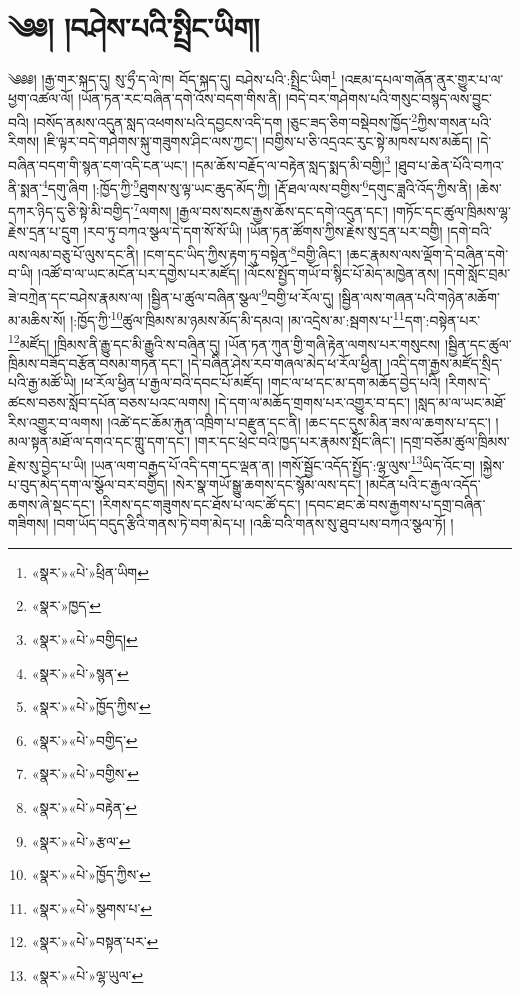 \chapter{༄༅། །བཤེས་པའི་སྤྲིང་ཡིག།}༄༅༅། །རྒྱ་གར་སྐད་དུ། སུ་ཧྲྀ་ད་ལེ་ཁ། བོད་སྐད་དུ། བཤེས་པའི་:སྤྲིང་ཡིག\footnote{«སྣར་»«པེ་»ཕྲིན་ཡིག} །འཇམ་དཔལ་གཞོན་ནུར་གྱུར་པ་ལ་ཕྱག་འཚལ་ལོ། །ཡོན་ཏན་རང་བཞིན་དགེ་འོས་བདག་གིས་ནི། །བདེ་བར་གཤེགས་པའི་གསུང་བསྙད་ལས་བྱུང་བའི། །བསོད་ནམས་འདུན་སླད་འཕགས་པའི་དབྱངས་འདི་དག །ཅུང་ཟད་ཅིག་བསྡེབས་ཁྱོད་\footnote{«སྣར་»ཁྱད་}ཀྱིས་གསན་པའི་རིགས། །ཇི་ལྟར་བདེ་གཤེགས་སྐུ་གཟུགས་ཤིང་ལས་ཀྱང་། །བགྱིས་པ་ཅི་འདྲའང་རུང་སྟེ་མཁས་པས་མཆོད། །དེ་བཞིན་བདག་གི་སྙན་ངག་འདི་ངན་ཡང་། །དམ་ཆོས་བརྗོད་ལ་བརྟེན་སླད་སྨད་མི་བགྱི།\footnote{«སྣར་»«པེ་»བགྱིད།} །ཐུབ་པ་ཆེན་པོའི་བཀའ་ནི་སྨན་\footnote{«སྣར་»«པེ་»སྙན་}དགུ་ཞིག །:ཁྱོད་ཀྱི་\footnote{«སྣར་»«པེ་»ཁྱོད་ཀྱིས་}ཐུགས་སུ་ལྟ་ཡང་ཆུད་མོད་ཀྱི། །རྡོ་ཐལ་ལས་བགྱིས་\footnote{«སྣར་»«པེ་»བགྱིད་}དགུང་ཟླའི་འོད་ཀྱིས་ནི། །ཆེས་དཀར་ཉིད་དུ་ཅི་སྟེ་མི་བགྱིད་\footnote{«སྣར་»«པེ་»བགྱིས་}ལགས། །རྒྱལ་བས་སངས་རྒྱས་ཆོས་དང་དགེ་འདུན་དང་། །གཏོང་དང་ཚུལ་ཁྲིམས་ལྷ་རྗེས་དྲན་པ་དྲུག །རབ་ཏུ་བཀའ་སྩལ་དེ་དག་སོ་སོ་ཡི། །ཡོན་ཏན་ཚོགས་ཀྱིས་རྗེས་སུ་དྲན་པར་བགྱི། །དགེ་བའི་ལས་ལམ་བཅུ་པོ་ལུས་དང་ནི། །ངག་དང་ཡིད་ཀྱིས་རྟག་ཏུ་བསྟེན་\footnote{«སྣར་»«པེ་»བརྟེན་}བགྱི་ཞིང་། །ཆང་རྣམས་ལས་ལྡོག་དེ་བཞིན་དགེ་བ་ཡི། །འཚོ་བ་ལ་ཡང་མངོན་པར་དགྱེས་པར་མཛོད། །ལོངས་སྤྱོད་གཡོ་བ་སྙིང་པོ་མེད་མཁྱེན་ནས། །དགེ་སློང་བྲམ་ཟེ་བཀྲེན་དང་བཤེས་རྣམས་ལ། །སྦྱིན་པ་ཚུལ་བཞིན་སྩལ་\footnote{«སྣར་»«པེ་»རྩལ་}བགྱི་ཕ་རོལ་དུ། །སྦྱིན་ལས་གཞན་པའི་གཉེན་མཆོག་མ་མཆིས་སོ། །:ཁྱོད་ཀྱི་\footnote{«སྣར་»«པེ་»ཁྱོད་ཀྱིས་}ཚུལ་ཁྲིམས་མ་ཉམས་མོད་མི་དམའ། །མ་འདྲེས་མ་:སྦགས་པ་\footnote{«སྣར་»«པེ་»སྩགས་པ་}དག་:བསྟེན་པར་\footnote{«སྣར་»«པེ་»བསྟན་པར་}མཛོད། །ཁྲིམས་ནི་རྒྱུ་དང་མི་རྒྱུའི་ས་བཞིན་དུ། །ཡོན་ཏན་ཀུན་གྱི་གཞི་རྟེན་ལགས་པར་གསུངས། །སྦྱིན་དང་ཚུལ་ཁྲིམས་བཟོད་བརྩོན་བསམ་གཏན་དང་། །དེ་བཞིན་ཤེས་རབ་གཞལ་མེད་ཕ་རོལ་ཕྱིན། །འདི་དག་རྒྱས་མཛོད་སྲིད་པའི་རྒྱ་མཚོ་ཡི། །ཕ་རོལ་ཕྱིན་པ་རྒྱལ་བའི་དབང་པོ་མཛོད། །གང་ལ་ཕ་དང་མ་དག་མཆོད་བྱེད་པའི། །རིགས་དེ་ཚངས་བཅས་སློབ་དཔོན་བཅས་པའང་ལགས། །དེ་དག་ལ་མཆོད་གྲགས་པར་འགྱུར་བ་དང་། །སླད་མ་ལ་ཡང་མཐོ་རིས་འགྱུར་བ་ལགས། །འཚེ་དང་ཆོམ་རྐུན་འཁྲིག་པ་བརྫུན་དང་ནི། །ཆང་དང་དུས་མིན་ཟས་ལ་ཆགས་པ་དང་། །མལ་སྟན་མཐོ་ལ་དགའ་དང་གླུ་དག་དང་། །གར་དང་ཕྲེང་བའི་ཁྱད་པར་རྣམས་སྤོང་ཞིང་། །དགྲ་བཅོམ་ཚུལ་ཁྲིམས་རྗེས་སུ་བྱེད་པ་ཡི། །ཡན་ལག་བརྒྱད་པོ་འདི་དག་དང་ལྡན་ན། །གསོ་སྦྱོང་འདོད་སྤྱོད་:ལྷ་ལུས་\footnote{«སྣར་»«པེ་»ལྷ་ཡུལ་}ཡིད་འོང་བ། །སྐྱེས་པ་བུད་མེད་དག་ལ་སྩོལ་བར་བགྱིད། །སེར་སྣ་གཡོ་སྒྱུ་ཆགས་དང་སྙོམ་ལས་དང་། །མངོན་པའི་ང་རྒྱལ་འདོད་ཆགས་ཞེ་སྡང་དང་། །རིགས་དང་གཟུགས་དང་ཐོས་པ་ལང་ཚོ་དང་། །དབང་ཐང་ཆེ་བས་རྒྱགས་པ་དགྲ་བཞིན་གཟིགས། །བག་ཡོད་བདུད་རྩིའི་གནས་ཏེ་བག་མེད་པ། །འཆི་བའི་གནས་སུ་ཐུབ་པས་བཀའ་སྩལ་ཏོ། །
